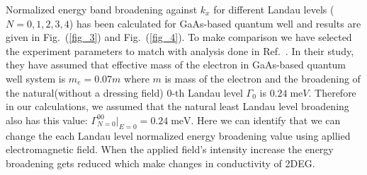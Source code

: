 Normalized energy band broadening against ${k_x}$ for different Landau levels ($N = 0,1,2,3,4$) has been calculated for GaAs-based quantum well and results are given in Fig.~(\ref{fig_3}) and Fig.~(\ref{fig_4}). To make comparison we have selected the experiment parameters to match with analysis done in Ref.~\cite{endo09}.
In their study, they have assumed that effective mass of the electron in GaAs-based quantum well system is $m_e = 0.07m$ where $m$ is mass of the electron \cite{endo09,winkler03,wackerl20} and the broadening of the natural(without a dressing field) $0$-th Landau level $\Gamma_0$ is $0.24\;\text{me}V$. Therefore in our calculations, we assumed that the natural least Landau level broadening also has this value: $\Gamma^{00}_{N=0}|_{E=0} = 0.24 \;\text{meV}$.
Here we can identify that we can change the each Landau level normalized energy broadening value using apllied electromagnetic field. When the applied field's intensity increase the energy broadening gets reduced which make changes in conductivity of 2DEG.
